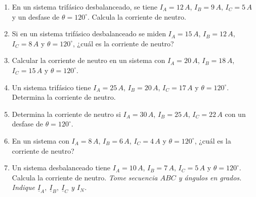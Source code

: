 \documentclass[../main]{subfiles}
\begin{document}
\begin{enumerate}
  \item En un sistema trifásico desbalanceado, se tiene $I_A = 12 \,
    A$, $I_B = 9 \, A$, $I_C = 5 \, A$ y un desfase de $\theta =
    120^\circ$. Calcula la corriente de neutro.
  \item Si en un sistema trifásico desbalanceado se miden $I_A = 15
    \, A$, $I_B = 12 \, A$, $I_C = 8 \, A$ y $\theta = 120^\circ$,
    ¿cuál es la corriente de neutro?
  \item Calcular la corriente de neutro en un sistema con $I_A = 20
    \, A$, $I_B = 18 \, A$, $I_C = 15 \, A$ y $\theta = 120^\circ$.
  \item Un sistema trifásico tiene $I_A = 25 \, A$, $I_B = 20 \, A$,
    $I_C = 17 \, A$ y $\theta = 120^\circ$. Determina la corriente de neutro.
  \item Determina la corriente de neutro si $I_A = 30 \, A$, $I_B =
    25 \, A$, $I_C = 22 \, A$ con un desfase de $\theta = 120^\circ$.
  \item En un sistema con $I_A = 8 \, A$, $I_B = 6 \, A$, $I_C = 4 \,
    A$ y $\theta = 120^\circ$, ¿cuál es la corriente de neutro?
  \item Un sistema desbalanceado tiene $I_A = 10 \, A$, $I_B = 7 \,
    A$, $I_C = 5 \, A$ y $\theta = 120^\circ$. Calcula la corriente de neutro.
    \textit{Tome secuencia $ABC$ y ángulos en grados. Indique
    $\underline{I}_A,\ \underline{I}_B,\ \underline{I}_C$ y $I_N$.}
\end{enumerate}
\end{document}
